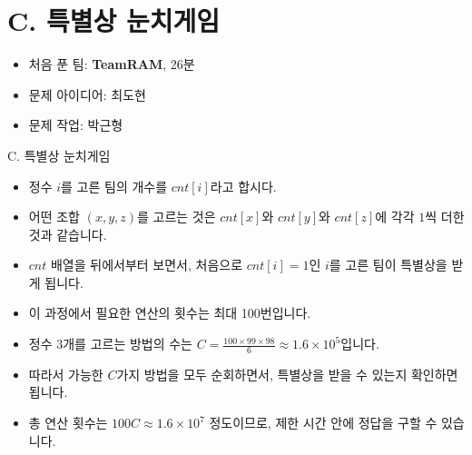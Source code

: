 \def\probno{C}
\def\probtitle{특별상 눈치게임}

\section{\probno{}. \probtitle{}}

\begin{frame} %
    \sectiontitle{\probno{}}{\probtitle{}}
    \begin{itemize}
        \item 처음 푼 팀: \textbf{TeamRAM}, 26분
        \item 문제 아이디어: 최도현
        \item 문제 작업: 박근형
    \end{itemize}
\end{frame}

\begin{frame}{\probno{}. \probtitle{}}
    \begin{itemize}
        \item 정수 $i$를 고른 팀의 개수를 $cnt[i]$라고 합시다.
        \item 어떤 조합 $(x, y, z)$를 고르는 것은 $cnt[x]$와 $cnt[y]$와 $cnt[z]$에 각각 $1$씩 더한 것과 같습니다.
        \vspace{3mm}
        \item $cnt$ 배열을 뒤에서부터 보면서, 처음으로 $cnt[i] = 1$인 $i$를 고른 팀이 특별상을 받게 됩니다.
        \item 이 과정에서 필요한 연산의 횟수는 최대 100번입니다.
        \item 정수 3개를 고르는 방법의 수는 $C = \frac{100\times 99 \times 98}{6} \approx 1.6 \times 10^5$입니다.
        \vspace{3mm}
        \item 따라서 가능한 $C$가지 방법을 모두 순회하면서, 특별상을 받을 수 있는지 확인하면 됩니다.
        \item 총 연산 횟수는 $100C \approx 1.6 \times 10^7$ 정도이므로, 제한 시간 안에 정답을 구할 수 있습니다.
    \end{itemize}
\end{frame}
